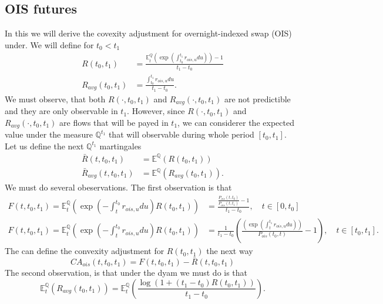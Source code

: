 \documentclass[a4paper,10pt]{article}
\newcommand{\1}{\mathbf{1}}
\begin{document}
\subsection{OIS futures}
In this we will derive the covexity adjustment for overnight-indexed swap (OIS) under. We will define for $t_0 < t_1$
\begin{align*}
R(t_0,t_1) &= \frac{\mathbb{E}_t^{Q}\left(\exp\left(\int_{t_0}^{t_1}r_{ois,u} du\right)\right) - 1}{t_1 - t_0} \\
R_{avg}(t_0,t_1) &= \frac{\int_{t_0}^{t_1}r_{ois,u} du}{t_1 - t_0}.
\end{align*}
We must observe, that both $R(\cdot,t_0,t_1)$ and $R_{avg}(\cdot,t_0,t_1)$  are not predictible and they are only observable in $t_1$. However, since
$R(\cdot,t_0,t_1)$ and $R_{avg}(\cdot,t_0,t_1)$ are flows that will be payed in $t_1$, we can considerer the expected value under the measure $\mathbb{Q}^{t_1}$ that will observable during whole period $[t_0, t_1]$. Let us define the next $\mathbb{Q}^{t_1}$ martingales  
\begin{align*} 
\bar{R}(t,t_0,t_1) &= \mathbb{E}^{\mathbb{Q}}\left( R(t_0,t_1)  \right) \\
\bar{R}_{avg}(t,t_0,t_1) &= \mathbb{E}^{\mathbb{Q}}\left( R_{avg}(t_0,t_1)  \right).
\end{align*}
We must do several obeservations. The first observation is that
\begin{align*}
F(t,t_0,t_1)=\mathbb{E}_{t}^{\mathbb{Q}}\left(\exp\left(-\int_{t}^{t_0} r_{ois,u} du \right) R(t_0,t_1) \right) &= \frac{\frac{P_{ois}(t,t_0)}{P_{ois}(t,t_1)} - 1}{t_1 - t_0}, \quad t \in [0,t_0] \\
F(t,t_0,t_1)=\mathbb{E}_{t}^{\mathbb{Q}}\left(\exp\left(-\int_{t}^{t_0} r_{ois,u} du \right) R(t_0,t_1) \right) &= \frac{1}{t_1 - t_0} \left(\frac{\left( \exp\left(\int_{t}^{t_1}r_{ois,u} du\right)\right)}{P_{ois}(t_0,t)}-1\right), \quad  t \in  [t_0, t_1].
\end{align*}
The can define the convexity adjustment for $ R(t_0,t_1)$ the next way
\begin{equation}\label{R_ois_ca}
CA_{ois}(t,t_0,t_1) = F(t,t_0,t_1) - \bar{R}(t,t_0,t_1) 
\end{equation}
The second observation, is that under the dyam we must do is that
\begin{equation*}
\mathbb{E}_{t}^{\mathbb{Q}}\left(R_{avg}(t_0,t_1) \right) = \mathbb{E}_t^{\mathbb{Q}}\left( \frac{\log\left(1+(t_1 - t_0)R(t_0,t_1) \right)}{t_1 - t_0} \right).  
\end{equation*}
\end{document}
